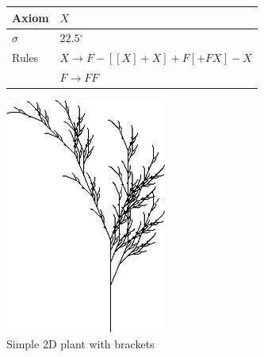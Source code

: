 \documentclass[11pt,a4paper]{article}
\newcommand{\degree}{\ensuremath{^\circ}}
\begin{document}
\begin{figure}[htb]
  \centering
  \begin{minipage}[c]{0.65\textwidth}
    \centering
    \begin{tabular}{l l}
Axiom & $X$ \\ \hline
$\sigma$ & $22.5$\degree \\ \hline
Rules & $X \rightarrow F-[[X]+X]+F[+FX]-X$ \\
& $F \rightarrow FF$ \\
	\end{tabular}
  \end{minipage}
  \begin{minipage}[c]{0.33\textwidth}
    \includegraphics[width=\textwidth]{tree.png}
  \end{minipage}
  \caption{Simple 2D plant with brackets}
  \label{fig:tree}
\end{figure}
\end{document}
